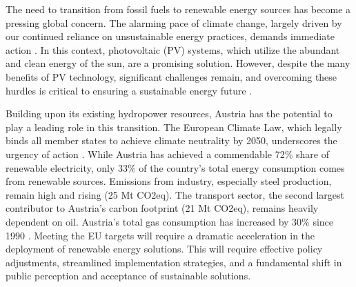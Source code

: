\documentclass[draft, final]{vutinfth} %
\begin{document}
The need to transition from fossil fuels to renewable energy sources has become a pressing global concern. The alarming pace of climate change, largely driven by our continued reliance on unsustainable energy practices, demands immediate action \cite{IPCC_2018_SR15}. In this context, photovoltaic (PV) systems, which utilize the abundant and clean energy of the sun, are a promising solution. However, despite the many benefits of PV technology, significant challenges remain, and overcoming these hurdles is critical to ensuring a sustainable energy future \cite{iea2020world}.

Building upon its existing hydropower resources, Austria has the potential to play a leading role in this transition. The European Climate Law, which legally binds all member states to achieve climate neutrality by 2050, underscores the urgency of action \cite{EUClimateLaw}.
While Austria has achieved a commendable 72\% share of renewable electricity, only 33\% of the country's total energy consumption comes from renewable sources. Emissions from industry, especially steel production, remain high and rising (25 Mt CO2eq). The transport sector, the second largest contributor to Austria's carbon footprint (21 Mt CO2eq), remains heavily dependent on oil. Austria's total gas consumption has increased by 30\% since 1990 \cite{StatistikAustria2024Energiebilanzen,KlimadashboardAT}. Meeting the EU targets will require a dramatic acceleration in the deployment of renewable energy solutions. This will require effective policy adjustments, streamlined implementation strategies, and a fundamental shift in public perception and acceptance of sustainable solutions.
\end{document}

